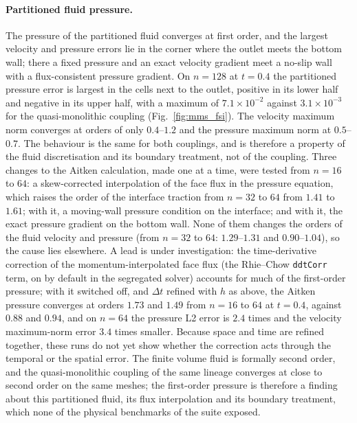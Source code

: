 \paragraph{Partitioned fluid pressure.}
The pressure of the partitioned fluid converges at first order, and the largest velocity and pressure errors lie in the corner where the outlet meets the bottom wall; there a fixed pressure and an exact velocity gradient meet a no-slip wall with a flux-consistent pressure gradient.
On $n = 128$ at $t = 0.4$ the partitioned pressure error is largest in the cells next to the outlet, positive in its lower half and negative in its upper half, with a maximum of $7.1\times10^{-2}$ against $3.1\times10^{-3}$ for the quasi-monolithic coupling (Fig.~\ref{fig:mms_fsi}).
The velocity maximum norm converges at orders of only $0.4$--$1.2$ and the pressure maximum norm at $0.5$--$0.7$.
The behaviour is the same for both couplings, and is therefore a property of the fluid discretisation and its boundary treatment, not of the coupling.
Three changes to the Aitken calculation, made one at a time, were tested from $n = 16$ to $64$: a skew-corrected interpolation of the face flux in the pressure equation, which raises the order of the interface traction from $n = 32$ to $64$ from $1.41$ to $1.61$; with it, a moving-wall pressure condition on the interface; and with it, the exact pressure gradient on the bottom wall. None of them changes the orders of the fluid velocity and pressure (from $n = 32$ to $64$: $1.29$--$1.31$ and $0.90$--$1.04$), so the cause lies elsewhere.
A lead is under investigation: the time-derivative correction of the momentum-interpolated face flux (the Rhie--Chow \texttt{ddtCorr} term, on by default in the segregated solver) accounts for much of the first-order pressure; with it switched off, and $\Delta t$ refined with $h$ as above, the Aitken pressure converges at orders $1.73$ and $1.49$ from $n = 16$ to $64$ at $t = 0.4$, against $0.88$ and $0.94$, and on $n = 64$ the pressure L2 error is $2.4$ times and the velocity maximum-norm error $3.4$ times smaller. Because space and time are refined together, these runs do not yet show whether the correction acts through the temporal or the spatial error.
The finite volume fluid is formally second order, and the quasi-monolithic coupling of the same lineage converges at close to second order on the same meshes; the first-order pressure is therefore a finding about this partitioned fluid, its flux interpolation and its boundary treatment, which none of the physical benchmarks of the suite exposed.

